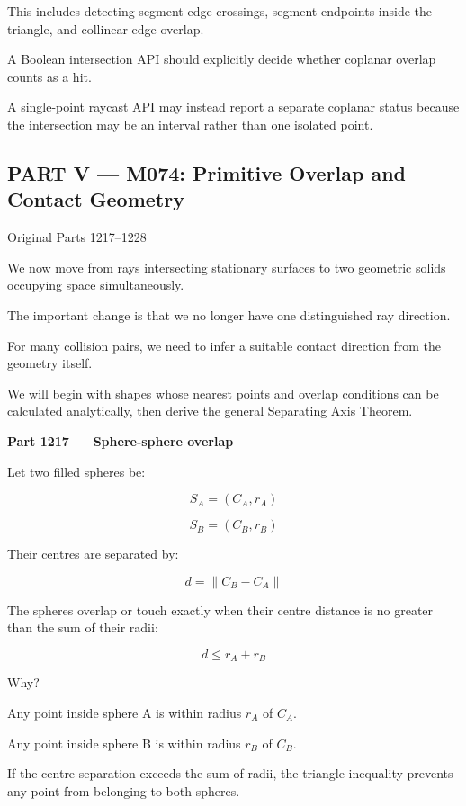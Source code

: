 This includes detecting segment-edge crossings, segment endpoints inside the triangle, and collinear edge overlap.

A Boolean intersection API should explicitly decide whether coplanar overlap counts as a hit.

A single-point raycast API may instead report a separate coplanar status because the intersection may be an interval rather than one isolated point.

\subsection{PART V --- M074: Primitive Overlap and Contact Geometry}\label{04-visual-computing-ii-ch024-part-v-m074-primitive-overlap-and-contact-geometry}

\hypertarget{04-visual-computing-ii-ch024-part-v-m074-primitive-overlap-and-contact-geometry}{}

Original Parts 1217--1228

We now move from rays intersecting stationary surfaces to two geometric solids occupying space simultaneously.

The important change is that we no longer have one distinguished ray direction.

For many collision pairs, we need to infer a suitable contact direction from the geometry itself.

We will begin with shapes whose nearest points and overlap conditions can be calculated analytically, then derive the general Separating Axis Theorem.

\textbf{Part 1217 --- Sphere-sphere overlap}

Let two filled spheres be:

\[
S_A=(C_A,r_A)
\]

\[
S_B=(C_B,r_B)
\]

Their centres are separated by:

\[
d=\|C_B-C_A\|
\]

The spheres overlap or touch exactly when their centre distance is no greater than the sum of their radii:

\[
\boxed{ d\le r_A+r_B }
\]

Why?

Any point inside sphere A is within radius \(r_A\) of \(C_A\).

Any point inside sphere B is within radius \(r_B\) of \(C_B\).

If the centre separation exceeds the sum of radii, the triangle inequality prevents any point from belonging to both spheres.

